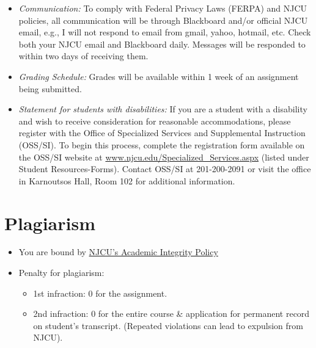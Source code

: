 \documentclass[11pt,article,oneside]{memoir}
\begin{document}
\begin{itemize}
\item \textit{Communication:} To comply with Federal Privacy Laws (FERPA) and NJCU policies, all communication will be through Blackboard and/or official NJCU email, e.g., I will not respond to email from gmail, yahoo, hotmail, etc. Check both your NJCU email and Blackboard daily. Messages will be responded to within two days of receiving them. 

\item \textit{Grading Schedule:} Grades will be available within 1 week of an assignment being submitted.

\item \textit{Statement for students with disabilities:} If you are a student
with a disability and wish to receive consideration for reasonable
accommodations, please register with the Office of Specialized Services
and Supplemental Instruction (OSS/SI). To begin this process, complete
the registration form available on the OSS/SI website at
\href{http://www.njcu.edu/Specialized_Services.aspx}{www.njcu.edu/Specialized\_Services.aspx}
(listed under Student Resources-Forms). Contact OSS/SI at 201-200-2091
or visit the office in Karnoutsos Hall, Room 102 for additional
information.
\end{itemize}

\section{Plagiarism}

\begin{itemize} 
\item You are bound by \href{http://www.njcu.edu/uploadedFiles/About_NJCU/Governance_and_Organization/University_Senate/Policies/Academic\%20INTEGRITY\%20POLICY\%20FINAL\%202-04.pdf}{NJCU's Academic Integrity Policy}
\item Penalty for plagiarism:
\begin{itemize}
\item 1st infraction: 0 for the assignment. 
\item 2nd infraction: 0 for the entire course \& application for permanent record on student's transcript. (Repeated violations can lead to expulsion from NJCU). 
\end{itemize}
\end{itemize}
\end{document}
